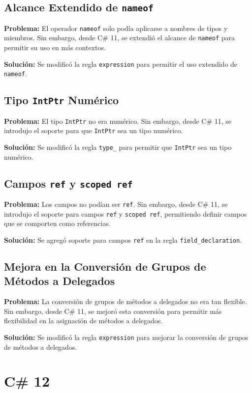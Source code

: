 \subsection*{Alcance Extendido de \texttt{nameof}}

\textbf{Problema:} El operador \texttt{nameof} solo podía aplicarse a nombres de tipos y miembros. Sin embargo, desde C\# 11, se extendió el alcance de \texttt{nameof} para permitir su uso en más contextos.

\textbf{Solución:} Se modificó la regla \texttt{expression} para permitir el uso extendido de \texttt{nameof}.

\subsection*{Tipo \texttt{IntPtr} Numérico}

\textbf{Problema:} El tipo \texttt{IntPtr} no era numérico. Sin embargo, desde C\# 11, se introdujo el soporte para que \texttt{IntPtr} sea un tipo numérico.

\textbf{Solución:} Se modificó la regla \texttt{type\_} para permitir que \texttt{IntPtr} sea un tipo numérico.

\subsection*{Campos \texttt{ref} y \texttt{scoped ref}}

\textbf{Problema:} Los campos no podían ser \texttt{ref}. Sin embargo, desde C\# 11, se introdujo el soporte para campos \texttt{ref} y \texttt{scoped ref}, permitiendo definir campos que se comporten como referencias.

\textbf{Solución:} Se agregó soporte para campos \texttt{ref} en la regla \texttt{field\_declaration}.

\subsection*{Mejora en la Conversión de Grupos de Métodos a Delegados}

\textbf{Problema:} La conversión de grupos de métodos a delegados no era tan flexible. Sin embargo, desde C\# 11, se mejoró esta conversión para permitir más flexibilidad en la asignación de métodos a delegados.

\textbf{Solución:} Se modificó la regla \texttt{expression} para mejorar la conversión de grupos de métodos a delegados.

\section*{C\# 12}

